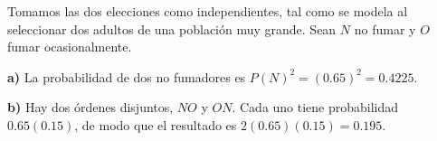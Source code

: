 Tomamos las dos elecciones como independientes, tal como
se modela al seleccionar dos adultos de una población muy grande.
Sean $N$ no fumar y $O$ fumar ocasionalmente.

\textbf{a)} La probabilidad de dos no fumadores es
$P(N)^2=(0.65)^2=\boxed{0.4225}$.

\textbf{b)} Hay dos órdenes disjuntos, $NO$ y $ON$.
Cada uno tiene probabilidad $0.65(0.15)$, de modo que el
resultado es $2(0.65)(0.15)=\boxed{0.195}$.
